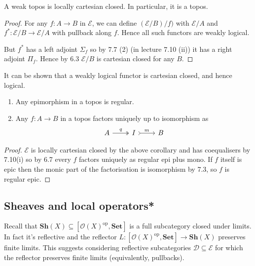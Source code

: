 \documentclass[a4paper]{article}
\renewcommand{\c}[1]{\mathbf{#1}}
\newcommand{\Set}{{\c{Set}}}
\newcommand{\Sh}{{\c{Sh}}}
\begin{document}
\begin{corollary}
  A weak topos is locally cartesian closed. In particular, it is a topos.
\end{corollary}

\begin{proof}
  For any \(f: A \to B\) in \(\mathcal E\), we can define \((\mathcal E/B)/f)\) with \(\mathcal E/A\) and \(f^*: \mathcal E/B \to \mathcal E/A\) with pullback along \(f\). Hence all such functors are weakly logical.

  But \(f^*\) has a left adjoint \(\Sigma_f\) so by 7.7 (2) (in lecture 7.10 (ii)) it has a right adjoint \(\Pi_f\). Hence by 6.3 \(\mathcal E/B\) is cartesian closed for any \(B\).
\end{proof}

\begin{remark}
  It can be shown that a weakly logical functor is cartesian closed, and hence logical.
\end{remark}

\begin{corollary}\leavevmode
  \begin{enumerate}
  \item Any epimorphism in a topos is regular.
  \item Any \(f: A \to B\) in a topos factors uniquely up to isomorphism as
    \[
      \begin{tikzcd}
        A \ar[r, "q", twoheadrightarrow] & I \ar[r, tail, "m"] & B
      \end{tikzcd}
    \]
  \end{enumerate}
\end{corollary}

\begin{proof}
  \(\mathcal E\) is locally cartesian closed by the above corollary and has coequalisers by 7.10(i) so by 6.7 every \(f\) factors uniquely as regular epi plus mono. If \(f\) itself is epic then the monic part of the factorisation is isomorphism by 7.3, so \(f\) is regular epic.
\end{proof}

\subsection{Sheaves and local operators*}

Recall that \(\Sh(X) \subseteq [\mathcal O(X)^{\text{op}}, \Set]\) is a full subcategory closed under limits. In fact it's reflective and the reflector \(L: [\mathcal O(X)^{\text{op}}, \Set] \to \Sh(X)\) preserves finite limits. This suggests considering reflective subcategories \(\mathcal D \subseteq \mathcal E\) for which the reflector preserves finite limits (equivalently, pullbacks).
\end{document}
